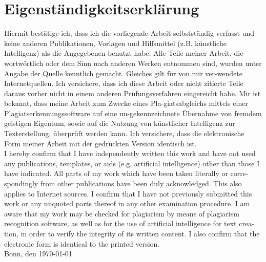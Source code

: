 
\chapter*{Eigenständigkeitserklärung }

Hiermit bestätige ich, dass ich die vorliegende Arbeit selbstständig verfasst und keine anderen Publikationen, Vorlagen und Hilfsmittel (z.B. künstliche Intelligenz) als die Angegebenen benutzt habe. Alle Teile meiner Arbeit, die wortwörtlich oder dem Sinn nach anderen Werken entnommen sind, wurden unter Angabe der Quelle kenntlich gemacht. Gleiches gilt für von mir ver-wendete Internetquellen. Ich versichere, dass ich diese Arbeit oder nicht zitierte Teile daraus vorher nicht in einem anderen Prüfungsverfahren eingereicht habe. Mir ist bekannt, dass meine Arbeit zum Zwecke eines Pla-giatsabgleichs mittels einer Plagiatserkennungssoftware auf eine un-gekennzeichnete Übernahme von fremdem geistigen Eigentum, sowie auf die Nutzung von künstlicher Intelligenz zur Texterstellung, überprüft werden kann. Ich versichere, dass die elektronische Form meiner Arbeit mit der gedruckten Version identisch ist.\\[1,5ex] 
I hereby confirm that I have independently written this work and have not used any publications, templates, or aids (e.g. artificial intelligence) other than those I have indicated. All parts of my work which have been taken literally or corre-spondingly from other publications have been duly acknowledged. This also applies to Internet sources. I confirm that I have not previously submitted this work or any unquoted parts thereof in any other examination procedure. I am aware that my work may be checked for plagiarism by means of plagiarism recognition software, as well as for the use of artificial intelligence for text crea-tion, in order to verify the integrity of its written content. I also confirm that the electronic form is identical to the printed version.
\\[2cm]
Bonn, den \german\today\hfill \namedesautors
